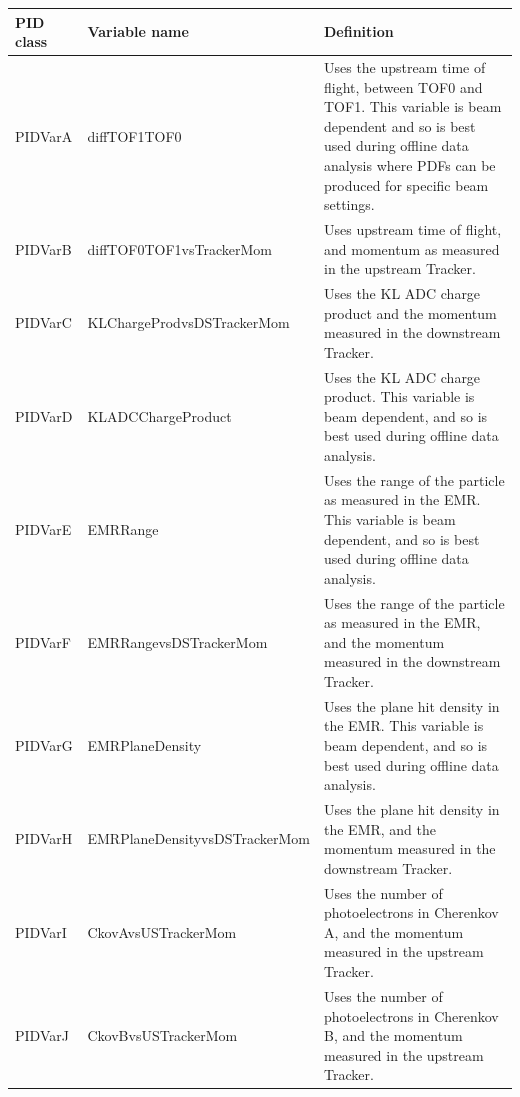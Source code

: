 \vspace {0.5cm}
\begin{tabular}{| l | l | p{5cm} |}
  \hline                       
  PID class & Variable name  & Definition \\
  \hline
  PIDVarA & diffTOF1TOF0 & Uses the upstream time of flight, between TOF0 and TOF1. This variable is beam dependent and so is best used during offline data analysis where PDFs can be produced for specific beam settings. \\
  PIDVarB & diffTOF0TOF1vsTrackerMom & Uses upstream time of flight, and momentum as measured in the upstream Tracker. \\  
  PIDVarC & KLChargeProdvsDSTrackerMom & Uses the KL ADC charge product and the momentum measured in the downstream Tracker. \\
  PIDVarD & KLADCChargeProduct & Uses the KL ADC charge product. This variable is beam dependent, and so is best used during offline data analysis.\\
  PIDVarE & EMRRange & Uses the range of the particle as measured in the EMR. This variable is beam dependent, and so is best used during offline data analysis. \\
  PIDVarF & EMRRangevsDSTrackerMom & Uses the range of the particle as measured in the EMR, and the momentum measured in the downstream Tracker. \\
  PIDVarG & EMRPlaneDensity & Uses the plane hit density in the EMR. This variable is beam dependent, and so is best used during offline data analysis.\\
  PIDVarH & EMRPlaneDensityvsDSTrackerMom & Uses the plane hit density in the EMR, and the momentum measured in the downstream Tracker.\\
  PIDVarI & CkovAvsUSTrackerMom & Uses the number of photoelectrons in Cherenkov A, and the momentum measured in the upstream Tracker.\\
  PIDVarJ & CkovBvsUSTrackerMom & Uses the number of photoelectrons in Cherenkov B, and the momentum measured in the upstream Tracker.\\
  \hline 
\end{tabular}

